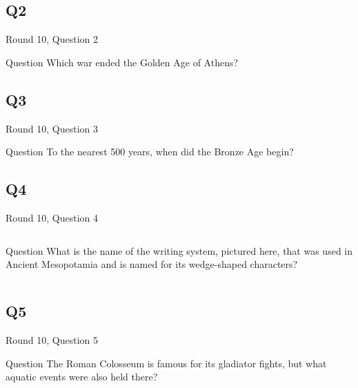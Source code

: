 \documentclass[11pt]{beamer}
\begin{document}
\subsection*{Q2}
\begin{frame}[t]{Round 10, Question 2}
\begin{block}{Question}
Which war ended the Golden Age of Athens?
\end{block}
\end{frame}
\subsection*{Q3}
\begin{frame}[t]{Round 10, Question 3}
\begin{block}{Question}
To the nearest 500 years, when did the Bronze Age begin?
\end{block}
\end{frame}
\subsection*{Q4}
\begin{frame}[t]{Round 10, Question 4}
\begin{columns}[T,totalwidth=\linewidth]
\begin{column}{0.32\linewidth}
\begin{block}{Question}
What is the name of the writing system, pictured here, that was used in Ancient Mesopotamia and is named for its wedge-shaped characters?
\end{block}
\end{column}
\begin{column}{0.65\linewidth}
\begin{center}
\texttt{[image: \{Images/cuneiform]}.jpg}
\end{center}
\end{column}
\end{columns}
\end{frame}
\subsection*{Q5}
\begin{frame}[t]{Round 10, Question 5}
\begin{block}{Question}
The Roman Colosseum is famous for its gladiator fights, but what aquatic events were also held there?
\end{block}
\end{frame}
\end{document}
